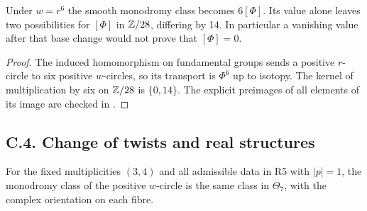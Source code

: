 \begin{proposition}
Under $w=r^6$ the smooth monodromy class becomes $6[\Phi]$.
Its value alone leaves two possibilities for $[\Phi]$ in $\mathbb Z/28$,
differing by 14. In particular a vanishing value after that base
change would not prove that $[\Phi]=0$.
\end{proposition}
\begin{proof}
The induced homomorphism on fundamental groups sends a positive
$r$-circle to six positive $w$-circles, so its transport is
$\Phi^6$ up to isotopy. The kernel of multiplication by six on
$\mathbb Z/28$ is $\{0,14\}$. The explicit preimages of all elements
of its image are checked in .
\end{proof}


























\subsection{C.4. Change of twists and real structures}

\begin{proposition}
For the fixed multiplicities $(3,4)$ and all admissible data in R5
with $|p|=1$, the monodromy class of the positive $w$-circle is the
same class in $\Theta_7$, with the complex orientation on each fibre.
\end{proposition}

